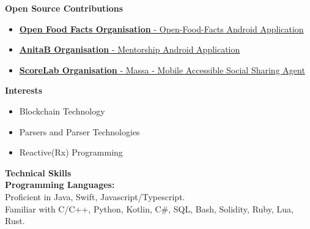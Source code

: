 \documentclass{article}
\begin{document}
\vspace{5pt}
\noindent \large \textbf{\textcolor{NavyBlue}{Open Source Contributions}} \vspace{5pt}
\begin{itemize}[noitemsep,nolistsep,leftmargin=*]
    \item { \normalsize \href{https://github.com/openfoodfacts/openfoodfacts-androidapp/pulls?q=is\%3Apr+author\%3Ashritesh99+is\%3Aclosed}{\textbf{Open Food Facts Organisation} - Open-Food-Facts Android Application } }
    \item { \normalsize \href{https://github.com/anitab-org/mentorship-android/pulls?q=is\%3Apr+author\%3AShritesh99+is\%3Aclosed}{\textbf{AnitaB Organisation} - Mentorship Android Application } }
    \item { \normalsize \href{https://github.com/scorelab/Massa/pulls/Shritesh99}{\textbf{ScoreLab Organisation} - Massa - Mobile Accessible Social Sharing Agent } }
\end{itemize}
\vspace{5pt}
\noindent \large \textbf{\textcolor{NavyBlue}{Interests}}
\begin{itemize}[noitemsep,nolistsep,leftmargin=*]
    \item {\normalsize Blockchain Technology}
    \item {\normalsize Parsers and Parser Technologies}
    \item {\normalsize Reactive(Rx) Programming}
\end{itemize}
\vspace{10pt}
\noindent \large \textbf{\textcolor{NavyBlue}{Technical Skills}} \vspace{5pt} \\
\noindent \normalsize \textbf{Programming Languages:} \\
\noindent \normalsize Proficient in Java, Swift, Javascript/Typescript. \\
\noindent \normalsize Familiar with C/C++, Python, Kotlin, C\#, SQL, Bash, Solidity, Ruby, Lua, Rust.
\vspace{5pt}
\end{document}
